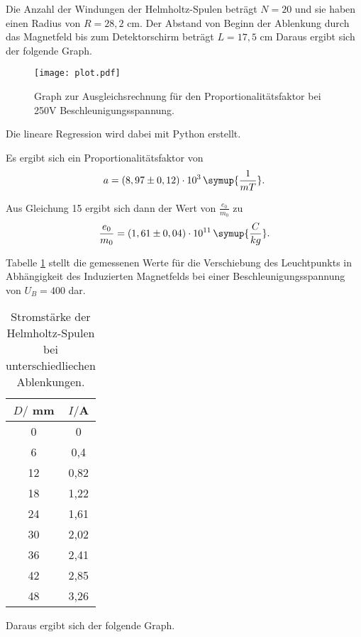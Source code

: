Die Anzahl der Windungen der Helmholtz-Spulen beträgt $N=20$ und sie haben einen Radius von $R = 28,2$ cm.
Der Abstand von Beginn der Ablenkung durch das Magnetfeld bis zum Detektorschirm beträgt $L = 17,5$ cm
Daraus ergibt sich der folgende Graph.

\begin{figure}[H]
  \centering
  \texttt{[image: plot.pdf]}
  \caption{Graph zur Ausgleichsrechnung für den Proportionalitätsfaktor bei 250V Beschleunigungsspannung.}
  \label{fig:plot}
\end{figure}

Die lineare Regression wird dabei mit Python erstellt.

Es ergibt sich ein Proportionalitätsfaktor von
\begin{equation*}
  a = (8,97 \pm 0,12)\cdot 10^3\, \symup{\frac{1}{mT}}.
\end{equation*}

Aus Gleichung 15 ergibt sich dann der Wert von $\frac{e_0}{m_0}$ zu
\begin{equation*}
  \frac{e_0}{m_0} = (1,61 \pm 0,04)\cdot 10^{11} \, \symup{\frac{C}{kg}}.
\end{equation*}



Tabelle \ref{tab:Magnetfeld1} stellt die gemessenen Werte für die Verschiebung des Leuchtpunkts in Abhängigkeit
des Induzierten Magnetfelds bei einer Beschleunigungsspannung von $U_B = 400$ dar.

\begin{table}[H]
  \centering
  \caption{Stromstärke der Helmholtz-Spulen bei unterschiedliechen Ablenkungen.}
  \label{tab:Magnetfeld1}
  \begin{tabular}{c c}
    \toprule
    $D/$ mm & $I/$A \\
    \midrule
    0 & 0 \\
    6 & 0,4 \\
    12 & 0,82 \\
    18 & 1,22 \\
    24 & 1,61 \\
    30 & 2,02 \\
    36 & 2,41 \\
    42 & 2,85 \\
    48 & 3,26 \\
    \bottomrule
  \end{tabular}
\end{table}

Daraus ergibt sich der folgende Graph.

